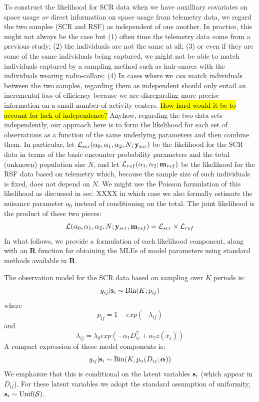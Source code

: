 To construct the likelihood for SCR data when we have auxilliary
covariates on space usage {\it or} direct information on space usage
from telemetry data, we regard the two samples (SCR and RSF) as
independent of one another. In practice, this might not always be the
case but (1) often time the telemetry data come from a previous study;
(2) the individuals are not the same at all; (3) or even if they are
some of the same individuals being captured, we might not be able to
match individuals captured by a sampling method such as hair-snares
with the individuals wearing radio-collars; (4) In cases where we {\it
  can} match individuals between the two samples, regarding them as
independent should only entail an incremental loss of efficiency
because we are disregarding more precise information on a small number
of activity centers. \hl{How hard would it be to account for lack of independence?}
Anyhow, regarding the two data sets independently, our approach here
is to form the likelihood for each set of observations as a function
of the same underlying parameters and then combine them. In
particular, let ${\cal L}_{scr}(\alpha_{0}, \alpha_{1}, \alpha_{2}, N;
{\bf y}_{scr})$
be the likelihood for the SCR data in terms of the basic encounter
probability parameters and the total (unknown) population size $N$,
and let ${\cal L}_{rsf}(\alpha_{1},\alpha_{2}; {\bf m}_{rsf})$ be the
likelihood for the RSF data based on telemetry which, because the
sample size of such individuals is fixed, does not depend on $N$. We
might use the Poisson formulation of this likelihood as discussed in
sec. XXXX in which case
we also formally estimate the nuisance parameter $a_{0}$ instead of
conditioning on the total.
The
joint likelihood is the product of these two pieces:
\[
{\cal L}(\alpha_{0},\alpha_{1},\alpha_{2},N; {\bf y}_{scr},{\bf
  m}_{rsf})  = {\cal L}_{scr} \times {\cal L}_{rsf}
\]
In what follows, we provide a formulation of each likelihood
component, along with an {\bf R} function for obtaining the MLEs of
model parameters using standard methods available in {\bf R}.

The observation model for the SCR data based on
sampling over $K$ periods  is:
\[
 y_{ij}|{\bf s}_{i} \sim \mbox{Bin}(K; p_{ij})
\]
where
\[
 p_{ij} = 1-exp(- \lambda_{ij} )
\]
and
\[
 \lambda_{ij} = \lambda_{0} exp(- \alpha_{1} D_{ij}^{2} + \alpha_{2}  z(x_{j}) )
\]
 A compact expression of these
model components is:
\begin{equation}
y_{ij}| {\bf s}_{i} \sim \mbox{Bin}(K, p_{\alpha}(D_{ij}; {\bm \alpha}))
\label{rsf.mle.eq.cond-on-s}
\end{equation}
We emphaisze that this is conditional on the latent variables ${\bf
  s}_{i}$ (which appear in $D_{ij}$). For these latent variables we
adopt the standard assumption of uniformity,
${\bf s}_{i} \sim  \mbox{Unif}({\cal  S})$.

